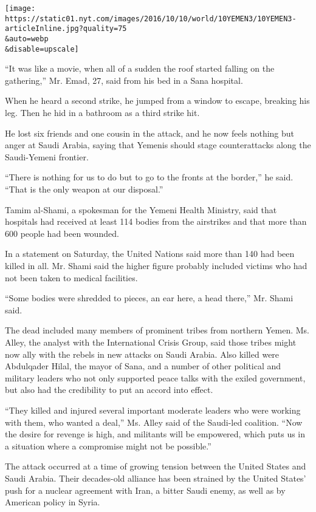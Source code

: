 \texttt{[image: https://static01.nyt.com/images/2016/10/10/world/10YEMEN3/10YEMEN3-articleInline.jpg?quality=75\\\&auto=webp\\\&disable=upscale]}

``It was like a movie, when all of a sudden the roof started falling on
the gathering,'' Mr. Emad, 27, said from his bed in a Sana hospital.

When he heard a second strike, he jumped from a window to escape,
breaking his leg. Then he hid in a bathroom as a third strike hit.

He lost six friends and one cousin in the attack, and he now feels
nothing but anger at Saudi Arabia, saying that Yemenis should stage
counterattacks along the Saudi-Yemeni frontier.

``There is nothing for us to do but to go to the fronts at the border,''
he said. ``That is the only weapon at our disposal.''

Tamim al-Shami, a spokesman for the Yemeni Health Ministry, said that
hospitals had received at least 114 bodies from the airstrikes and that
more than 600 people had been wounded.

In a statement on Saturday, the United Nations said more than 140 had
been killed in all. Mr. Shami said the higher figure probably included
victims who had not been taken to medical facilities.

``Some bodies were shredded to pieces, an ear here, a head there,'' Mr.
Shami said.

The dead included many members of prominent tribes from northern Yemen.
Ms. Alley, the analyst with the International Crisis Group, said those
tribes might now ally with the rebels in new attacks on Saudi Arabia.
Also killed were Abdulqader Hilal, the mayor of Sana, and a number of
other political and military leaders who not only supported peace talks
with the exiled government, but also had the credibility to put an
accord into effect.

``They killed and injured several important moderate leaders who were
working with them, who wanted a deal,'' Ms. Alley said of the Saudi-led
coalition. ``Now the desire for revenge is high, and militants will be
empowered, which puts us in a situation where a compromise might not be
possible.''

The attack occurred at a time of growing tension between the United
States and Saudi Arabia. Their decades-old alliance has been strained by
the United States' push for a nuclear agreement with Iran, a bitter
Saudi enemy, as well as by American policy in Syria.

